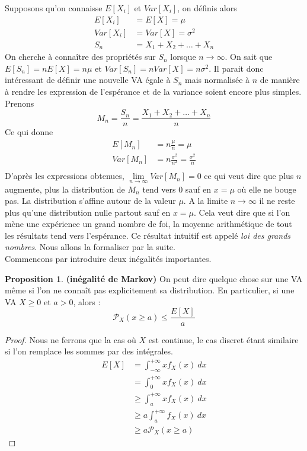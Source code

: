 \documentclass[a4paper,12pt]{report}
\theoremstyle{definition}
\newcommand{\ra}{\rightarrow}
\renewcommand{\(}{\left(}
\renewcommand{\)}{\right)}
\renewcommand{\b}{\textbf}
\renewcommand{\P}{\mathcal{P}}
\renewcommand{\d}{\textit}
\newtheorem{prop}[thm]{Proposition}
\begin{document}
        Supposons qu'on connaisse $E[X_i]$ et $Var[X_i]$, on définis alors
        \begin{align*}
            E[X_i] &= E[X] = \mu \\
            Var[X_i] &= Var[X] = \sigma^2 \\
            S_n &= X_1+X_2+\dots+X_n
        \end{align*}
        On cherche à connaître des propriétés sur $S_n$ lorsque $n\ra\infty$. On sait que $E[S_n] = nE[X] = n\mu$ et $Var[S_n] = nVar[X] = n\sigma^2$. Il parait donc intéressant de définir une nouvelle VA égale à $S_n$ mais normalisée à $n$ de manière à rendre les expression de l'espérance et de la variance soient encore plus simples. Prenons
        $$M_n = \frac{S_n}{n} = \frac{X_1+X_2+\dots+X_n}{n}$$
        Ce qui donne
        \begin{align*}
            E[M_n] &= n\frac{\mu}{n} = \mu \\
            Var[M_n] &= n\frac{\sigma^2}{n^2} = \frac{\sigma^2}{n} \\
        \end{align*}
        D'après les expressions obtenues, $\lim\limits_{n\ra\infty}Var[M_n] = 0$ ce qui veut dire que plus $n$ augmente, plus la distribution de $M_n$ tend vers 0 sauf en $x=\mu$ où elle ne bouge pas. La distribution s'affine autour de la valeur $\mu$. A la limite $n\ra\infty$ il ne reste plus qu'une distribution nulle partout sauf en $x=\mu$. Cela veut dire que si l'on mène une expérience un grand nombre de foi, la moyenne arithmétique de tout les résultats tend vers l'espérance. Ce résultat intuitif est appelé \d{loi des grands nombres}. Nous allons la formaliser par la suite. \\
        Commencons par introduire deux inégalités importantes.
        
        \begin{leftbar}
        \begin{prop}\b{(inégalité de Markov)}
            On peut dire quelque chose sur une VA même si l'on ne connaît pas explicitement sa distribution. En particulier, si une VA $X\geq0$ et $a > 0$, alors :
            $$\P_X(x\geq a) \leq \frac{E[X]}{a}$$
        \end{prop}
        \end{leftbar}
        
        \begin{proof}
            Nous ne ferrons que la cas où $X$ est continue, le cas discret étant similaire si l'on remplace les sommes par des intégrales.
            \begin{align*}
                E[X] &= \int_{-\infty}^{+\infty}xf_X(x)~dx\\
                &= \int_{0}^{+\infty}xf_X(x)~dx\\
                &\geq \int_{a}^{+\infty}xf_X(x)~dx\\
                &\geq a\int_{a}^{+\infty}f_X(x)~dx\\
                &\geq a\P_X(x\geq a)
            \end{align*}
        \end{proof}
        
\end{document}
